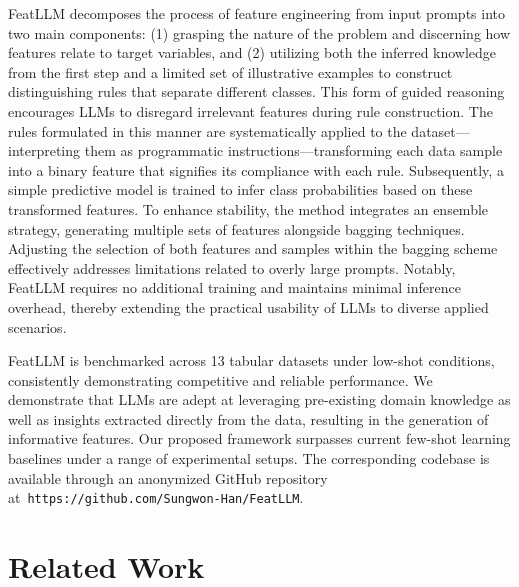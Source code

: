 \textsf{FeatLLM} decomposes the process of feature engineering from input prompts into two main components: (1) grasping the nature of the problem and discerning how features relate to target variables, and (2) utilizing both the inferred knowledge from the first step and a limited set of illustrative examples to construct distinguishing rules that separate different classes. This form of guided reasoning encourages LLMs to disregard irrelevant features during rule construction. The rules formulated in this manner are systematically applied to the dataset—interpreting them as programmatic instructions—transforming each data sample into a binary feature that signifies its compliance with each rule. Subsequently, a simple predictive model is trained to infer class probabilities based on these transformed features. To enhance stability, the method integrates an ensemble strategy, generating multiple sets of features alongside bagging techniques. Adjusting the selection of both features and samples within the bagging scheme effectively addresses limitations related to overly large prompts. Notably, \textsf{FeatLLM} requires no additional training and maintains minimal inference overhead, thereby extending the practical usability of LLMs to diverse applied scenarios.

\textsf{FeatLLM} is benchmarked across 13 tabular datasets under low-shot conditions, consistently demonstrating competitive and reliable performance. We demonstrate that LLMs are adept at leveraging pre-existing domain knowledge as well as insights extracted directly from the data, resulting in the generation of informative features. Our proposed framework surpasses current few-shot learning baselines under a range of experimental setups. The corresponding codebase is available through an anonymized GitHub repository at~\texttt{https://github.com/Sungwon-Han/FeatLLM}.

\section{Related Work}

